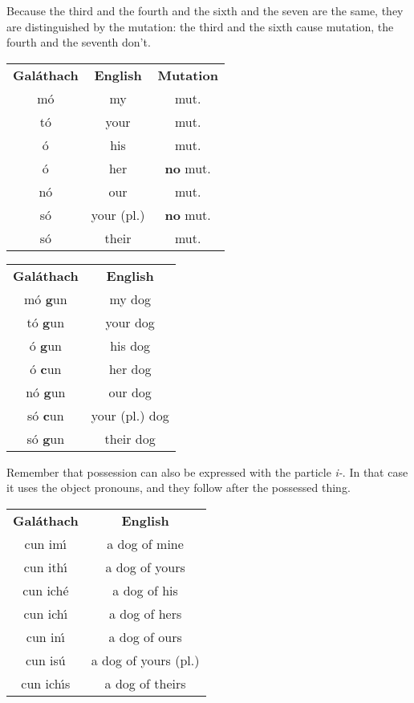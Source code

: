 Because the third and the fourth and the sixth and the seven are the same, they are distinguished by the mutation: the third and the sixth cause mutation, the fourth and the seventh don't.
\begin{table}[H]
\centering
\begin{tabular}{ccc}
  \toprule
  \textbf{Gal\'{a}thach} & \textbf{English} & \textbf{Mutation}\\
  \cmidrule(lr){1-1}\cmidrule(lr){2-2}\cmidrule(lr){3-3}
  m\'{o} & my & mut.\\
  t\'{o} & your & mut.\\
  \'{o} & his & mut.\\
  \'{o} & her & \textbf{no} mut.\\
  n\'{o} & our & mut.\\
  s\'{o} & your (pl.) & \textbf{no} mut.\\
  s\'{o} & their & mut.\\
  \bottomrule
\end{tabular}
\label{summary_possessive_pronoun_mutation}
\end{table}

\begin{table}[H]
\centering
\begin{tabular}{cc}
  \toprule
  \textbf{Gal\'{a}thach} & \textbf{English}\\
  \cmidrule(lr){1-1}\cmidrule(lr){2-2}
  m\'{o} \textbf{g}un & my dog\\
  t\'{o} \textbf{g}un & your dog\\
  \'{o} \textbf{g}un & his dog\\
  \'{o} \textbf{c}un & her dog\\
  n\'{o} \textbf{g}un & our dog\\
  s\'{o} \textbf{c}un & your (pl.) dog\\
  s\'{o} \textbf{g}un & their dog\\
  \bottomrule
\end{tabular}
\label{examples_possessive_pronoun_mutation}
\end{table}

Remember that possession can also be expressed with the particle \textit{i-}. In that case it uses the object pronouns, and they follow after the possessed thing.
\begin{table}[H]
\centering
\begin{tabular}{cc}
  \toprule
  \textbf{Gal\'{a}thach} & \textbf{English}\\
  \cmidrule(lr){1-1}\cmidrule(lr){2-2}
  cun im\'{\i} & a dog of mine\\
  cun ith\'{\i} & a dog of yours\\
  cun ich\'{e} & a dog of his\\
  cun ich\'{\i} & a dog of hers\\
  cun in\'{\i} & a dog of ours\\
  cun is\'{u} & a dog of yours (pl.)\\
  cun ich\'{\i}s & a dog of theirs\\
  \bottomrule
\end{tabular}
\label{examples_possessive_pronoun_particle_i}
\end{table}


